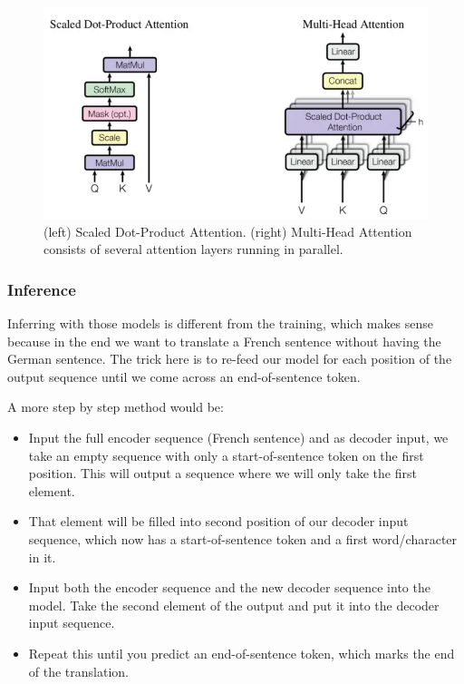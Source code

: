 \begin{figure}
    \centering
    \includegraphics[width=\textwidth]{images/multiHeadAttentionBricks.png}
    \caption{(left) Scaled Dot-Product Attention. (right) Multi-Head Attention consists of several attention layers running in parallel.}
    \label{fig:multiHeadAttentionBricks}
\end{figure}

\subsubsection{Inference}
Inferring with those models is different from the training, which makes sense because in the end we want to translate a French sentence without having the German sentence. The trick here is to re-feed our model for each position of the output sequence until we come across an end-of-sentence token. \newline

A more step by step method would be:
\begin{itemize}
    \item Input the full encoder sequence (French sentence) and as decoder input, we take an empty sequence with only a start-of-sentence token on the first position. This will output a sequence where we will only take the first element.
    
    \item That element will be filled into second position of our decoder input sequence, which now has a start-of-sentence token and a first word/character in it.
    
    \item Input both the encoder sequence and the new decoder sequence into the model. Take the second element of the output and put it into the decoder input sequence.
    
    \item Repeat this until you predict an end-of-sentence token, which marks the end of the translation.
\end{itemize}

